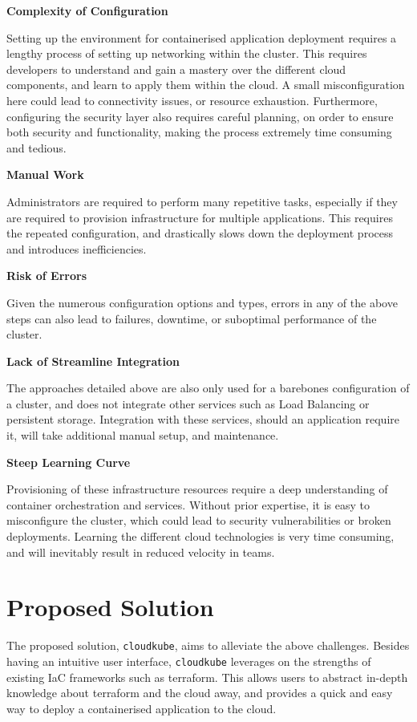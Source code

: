 \textbf{Complexity of Configuration}

Setting up the environment for containerised application deployment requires a lengthy process of setting up networking within the cluster. This requires developers to understand and gain a mastery over the different cloud components, and learn to apply them within the cloud. A small misconfiguration here could lead to connectivity issues, or resource exhaustion. Furthermore, configuring the security layer also requires careful planning, on order to ensure both security and functionality, making the process extremely time consuming and tedious.

\textbf{Manual Work}

Administrators are required to perform many repetitive tasks, especially if they are required to provision infrastructure for multiple applications. This requires the repeated configuration, and drastically slows down the deployment process and introduces inefficiencies. 

\textbf{Risk of Errors}

Given the numerous configuration options and types, errors in any of the above steps can also lead to failures, downtime, or suboptimal performance of the cluster.

\textbf{Lack of Streamline Integration}

The approaches detailed above are also only used for a barebones configuration of a cluster, and does not integrate other services such as Load Balancing or persistent storage. Integration with these services, should an application require it, will take additional manual setup, and maintenance. 

\textbf{Steep Learning Curve}

Provisioning of these infrastructure resources require a deep understanding of container orchestration and services. Without prior expertise, it is easy to misconfigure the cluster, which could lead to security vulnerabilities or broken deployments. Learning the different cloud technologies is very time consuming, and will inevitably result in reduced velocity in teams. 


\section{Proposed Solution}
The proposed solution, \texttt{cloudkube}, aims to alleviate the above challenges. Besides having an intuitive user interface, \texttt{cloudkube} leverages on the strengths of existing IaC frameworks such as terraform. This allows users to abstract in-depth knowledge about terraform and the cloud away, and provides a quick and easy way to deploy a containerised application to the cloud. 


